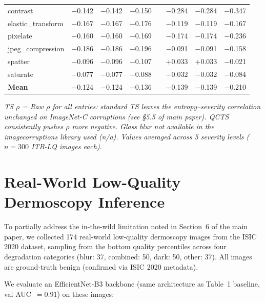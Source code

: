 \documentclass{bmvc2k}
\begin{document}
\begin{longtable}{lccccccc}
contrast           & $-$0.142 & $-$0.142 & $-$0.150 & & $-$0.284 & $-$0.284 & $-$0.347 \\
elastic\_transform & $-$0.167 & $-$0.167 & $-$0.176 & & $-$0.119 & $-$0.119 & $-$0.167 \\
pixelate           & $-$0.160 & $-$0.160 & $-$0.169 & & $-$0.174 & $-$0.174 & $-$0.236 \\
jpeg\_compression  & $-$0.186 & $-$0.186 & $-$0.196 & & $-$0.091 & $-$0.091 & $-$0.158 \\
spatter            & $-$0.096 & $-$0.096 & $-$0.107 & & $+$0.033 & $+$0.033 & $-$0.021 \\
saturate           & $-$0.077 & $-$0.077 & $-$0.088 & & $-$0.032 & $-$0.032 & $-$0.084 \\
\midrule
\textbf{Mean}      & $-$0.124 & $-$0.124 & $-$0.136 & & $-$0.139 & $-$0.139 & $-$0.210 \\
\end{longtable}

\emph{TS $\rho$ = Raw $\rho$ for all entries: standard TS leaves the entropy--severity correlation unchanged on ImageNet-C corruptions (see \S5.5 of main paper). QCTS consistently pushes $\rho$ more negative. Glass blur not available in the imagecorruptions library used (n/a). Values averaged across 5 severity levels ($n{=}300$ ITB-LQ images each).}

\section{Real-World Low-Quality Dermoscopy Inference}
\label{app:real_lq}

To partially address the in-the-wild limitation noted in Section~6 of the main paper, we collected 174 real-world low-quality dermoscopy images from the ISIC 2020 dataset, sampling from the bottom quality percentiles across four degradation categories (blur: 37, combined: 50, dark: 50, other: 37). All images are ground-truth benign (confirmed via ISIC 2020 metadata).

We evaluate an EfficientNet-B3 backbone (same architecture as Table~1 baseline, val AUC~$=0.91$) on these images:
\end{document}

